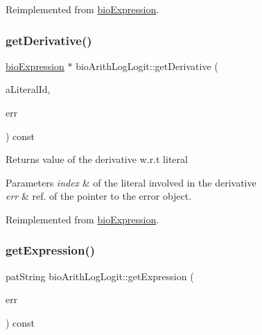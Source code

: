 Reimplemented from \hyperlink{classbio_expression_a4ee1b8add634078a02eaae26cd40dcc8}{bio\+Expression}.

\mbox{\label{classbio_arith_log_logit_a88dd7f743a13f5b836d2c4008d09845f}} 
\subsubsection{\texorpdfstring{get\+Derivative()}{getDerivative()}}
{\footnotesize\ttfamily \hyperlink{classbio_expression}{bio\+Expression} $\ast$ bio\+Arith\+Log\+Logit\+::get\+Derivative (\begin{DoxyParamCaption}\item[{pat\+U\+Long}]{a\+Literal\+Id,  }\item[{pat\+Error $\ast$\&}]{err }\end{DoxyParamCaption}) const\hspace{0.3cm}{\ttfamily [virtual]}}

\begin{DoxyReturn}{Returns}
value of the derivative w.\+r.\+t literal 
\end{DoxyReturn}

\begin{DoxyParams}{Parameters}
{\em index} & of the literal involved in the derivative \\
\hline
{\em err} & ref. of the pointer to the error object. \\
\hline
\end{DoxyParams}


Reimplemented from \hyperlink{classbio_expression_a5915579d1193f25f216c1e273c97f2ce}{bio\+Expression}.

\mbox{\label{classbio_arith_log_logit_a2683202928e4c00aa06460027a5aa332}} 
\subsubsection{\texorpdfstring{get\+Expression()}{getExpression()}}
{\footnotesize\ttfamily pat\+String bio\+Arith\+Log\+Logit\+::get\+Expression (\begin{DoxyParamCaption}\item[{pat\+Error $\ast$\&}]{err }\end{DoxyParamCaption}) const\hspace{0.3cm}{\ttfamily [virtual]}}

